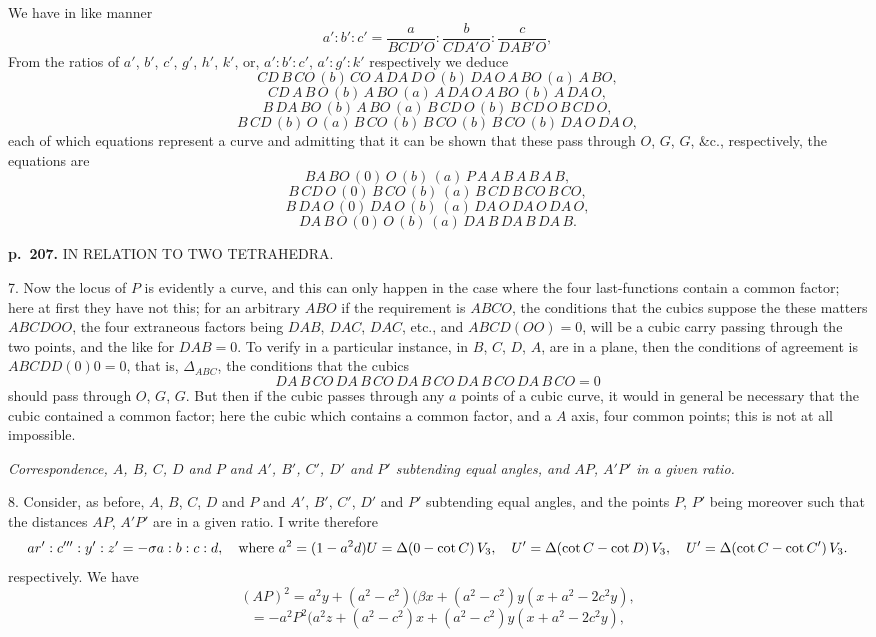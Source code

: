 \documentclass[11pt,a4paper]{book}
\begin{document}
We have in like manner
\[
a' : b' : c' = \frac{a}{BCD'O} : \frac{b}{CDA'O} : \frac{c}{DAB'O},
\]
From the ratios of $a'$, $b'$, $c'$, $g'$, $h'$, $k'$, or, $a' : b' : c'$, $a' : g' : k'$ respectively we deduce
\[
CD\,B\,CO\,(b)\,CO\,A\,DA\,D\,O\,(b)\,DA\,O\,A\,BO\,(a)\,A\,BO,
\]
\[
CD\,A\,B\,O\,(b)\,A\,BO\,(a)\,A\,DA\,O\,A\,BO\,(b)\,A\,DA\,O,
\]
\[
B\,DA\,BO\,(b)\,A\,BO\,(a)\,B\,CD\,O\,(b)\,B\,CD\,O\,B\,CD\,O,
\]
\[
B\,CD\,(b)\,O\,(a)\,B\,CO\,(b)\,B\,CO\,(b)\,B\,CO\,(b)\,DA\,O\,DA\,O,
\]
each of which equations represent a curve and admitting that it can be shown that these pass through $O$, $G$, $G$, \&c., respectively, the equations are
\[
BA\,BO\,(0)\,O\,(b)\,(a)\,P\,A\,A\,B\,A\,B\,A\,B,
\]
\[
B\,CD\,O\,(0)\,B\,CO\,(b)\,(a)\,B\,CD\,B\,CO\,B\,CO,
\]
\[
B\,DA\,O\,(0)\,DA\,O\,(b)\,(a)\,DA\,O\,DA\,O\,DA\,O,
\]
\[
DA\,B\,O\,(0)\,O\,(b)\,(a)\,DA\,B\,DA\,B\,DA\,B.
\]

\clearpage

\noindent
\textbf{p.~207.}  IN RELATION TO TWO TETRAHEDRA.

7. Now the locus of $P$ is evidently a curve, and this can only happen in the case where the four last-functions contain a common factor; here at first they have not this; for an arbitrary $ABO$ if the requirement is $ABCO$, the conditions that the cubics suppose the these matters $ABCDOO$, the four extraneous factors being $DA B$, $DA C$, $DA C$, etc., and $ABCD(OO) = 0$, will be a cubic carry passing through the two points, and the like for $DA B = 0$. To verify in a particular instance, in $B$, $C$, $D$, $A$, are in a plane, then the conditions of agreement is $ABCDD(0)0 = 0$, that is, $\Delta_{ABC}$, the conditions that the cubics
\[
DA\,B\,CO\,DA\,B\,CO\,DA\,B\,CO\,DA\,B\,CO\,DA\,B\,CO = 0
\]
should pass through $O$, $G$, $G$. But then if the cubic passes through any $a$ points of a cubic curve, it would in general be necessary that the cubic contained a common factor; here the cubic which contains a common factor, and a $A$ axis, four common points; this is not at all impossible.

\textit{Correspondence, $A$, $B$, $C$, $D$ and $P$ and $A'$, $B'$, $C'$, $D'$ and $P'$ subtending equal angles, and $AP$, $A'P'$ in a given ratio.}

8. Consider, as before, $A$, $B$, $C$, $D$ and $P$ and $A'$, $B'$, $C'$, $D'$ and $P'$ subtending equal angles, and the points $P$, $P'$ being moreover such that the distances $AP$, $A'P'$ are in a given ratio. I write therefore
\[
ar' : c''' : y' : z' = -\sigma a : b : c : d, \quad \text{where } a^2 = (1 - a^2 d) \\
U = \Delta(0 - \cot C)\,V_3, \quad U' = \Delta(\cot C - \cot D)\,V_3, \quad U' = \Delta(\cot C - \cot C')\,V_3.
\]
respectively. We have
\[
(AP)^2 = a^2 y + (a^2 - c^2)(\beta x + (a^2 - c^2)y(x + a^2 - 2c^2 y),
\]
\[
= -a^2 P^2 (a^2 z + (a^2 - c^2)x + (a^2 - c^2)y(x + a^2 - 2c^2 y),
\]
\end{document}

